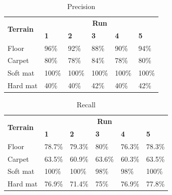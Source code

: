 \documentclass[USenglish]{ifimaster}  %
\begin{document}
\begin{table}[h]
	\centering
	\begin{tabular}{@{}llllll@{}}
		\toprule
		\multirow{2}{*}{\textbf{Terrain}} & \multicolumn{5}{c}{\textbf{Run}} \\ \cmidrule(l){2-6} 
		& \multicolumn{1}{l|}{\textbf{1}} & \multicolumn{1}{l|}{\textbf{2}} & \multicolumn{1}{l|}{\textbf{3}} & \multicolumn{1}{l|}{\textbf{4}} & \textbf{5} \\ \midrule
		\multicolumn{1}{l|}{Floor} & \multicolumn{1}{l|}{96\%} & \multicolumn{1}{l|}{92\%} & \multicolumn{1}{l|}{88\%} & \multicolumn{1}{l|}{90\%} & 94\% \\ \midrule
		\multicolumn{1}{l|}{Carpet} & \multicolumn{1}{l|}{80\%} & \multicolumn{1}{l|}{78\%} & \multicolumn{1}{l|}{84\%} & \multicolumn{1}{l|}{78\%} & 80\% \\ \midrule
		\multicolumn{1}{l|}{Soft mat} & \multicolumn{1}{l|}{100\%} & \multicolumn{1}{l|}{100\%} & \multicolumn{1}{l|}{100\%} & \multicolumn{1}{l|}{100\%} & 100\% \\ \midrule
		\multicolumn{1}{l|}{Hard mat} & \multicolumn{1}{l|}{40\%} & \multicolumn{1}{l|}{40\%} & \multicolumn{1}{l|}{42\%} & \multicolumn{1}{l|}{40\%} & 42\% \\ \bottomrule
	\end{tabular}
	\caption{Precision}
	\label{tabl:nnset5pre}
\end{table}
\FloatBarrier
\begin{table}[h]
	\centering
	\begin{tabular}{@{}llllll@{}}
		\toprule
		\multirow{2}{*}{\textbf{Terrain}} & \multicolumn{5}{c}{\textbf{Run}} \\ \cmidrule(l){2-6} 
		& \multicolumn{1}{l|}{\textbf{1}} & \multicolumn{1}{l|}{\textbf{2}} & \multicolumn{1}{l|}{\textbf{3}} & \multicolumn{1}{l|}{\textbf{4}} & \textbf{5} \\ \midrule
		\multicolumn{1}{l|}{Floor} & \multicolumn{1}{l|}{78.7\%} & \multicolumn{1}{l|}{79.3\%} & \multicolumn{1}{l|}{80\%} & \multicolumn{1}{l|}{76.3\%} & 78.3\% \\ \midrule
		\multicolumn{1}{l|}{Carpet} & \multicolumn{1}{l|}{63.5\%} & \multicolumn{1}{l|}{60.9\%} & \multicolumn{1}{l|}{63.6\%} & \multicolumn{1}{l|}{60.3\%} & 63.5\% \\ \midrule
		\multicolumn{1}{l|}{Soft mat} & \multicolumn{1}{l|}{100\%} & \multicolumn{1}{l|}{100\%} & \multicolumn{1}{l|}{98\%} & \multicolumn{1}{l|}{98\%} & 100\% \\ \midrule
		\multicolumn{1}{l|}{Hard mat} & \multicolumn{1}{l|}{76.9\%} & \multicolumn{1}{l|}{71.4\%} & \multicolumn{1}{l|}{75\%} & \multicolumn{1}{l|}{76.9\%} & 77.8\% \\ \bottomrule
	\end{tabular}
	\caption{Recall}
	\label{tab:nnset53}
\end{table}
\FloatBarrier
\end{document}
